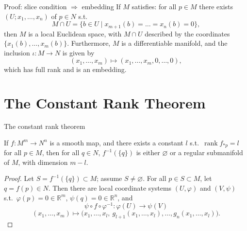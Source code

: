 \documentclass[10pt]{beamer}
\newcommand{\R}{\mathbb{R}}
\begin{document}
\begin{frame}{Proof: slice condition $\Rightarrow$ embedding}
	If $M$ satisfies: for all $p \in M$ there exists
	$(U; x_1, \dots, x_n)$ of $p \in N$ s.t.
	\[
		M \cap U = \{ b \in U \mid x_{m+1}(b) = \dots = x_n(b) = 0 \},
	\]
	then $M$ is a local Euclidean space, with $M \cap U$ described by
	the coordinates $\{ x_1(b), \dots, x_m(b) \}$. Furthermore, $M$
	is a differentiable manifold, and the inclusion $\iota : M \to N$
	is given by
	\[
		(x_1, \dots, x_m) \longmapsto (x_1, \dots, x_m, 0, \dots, 0),
	\]
	which has full rank and is an embedding. \qedhere
\end{frame}

\section{The Constant Rank Theorem}

\begin{frame}{The constant rank theorem}
	\begin{theorem}
		If $f : M^m \to N^n$ is a smooth map, and there exists a
		constant $l$ s.t.\ $\operatorname{rank} f_{*p} = l$ for all
		$p \in M$, then for all $q \in N$, $f^{-1}(\{q\})$ is either
		$\varnothing$ or a regular submanifold of $M$, with dimension
		$m - l$.
	\end{theorem}
	\begin{proof}
		Let $S = f^{-1}(\{q\}) \subset M$; assume $S \neq \varnothing$.
		For all $p \in S \subset M$, let $q = f(p) \in N$. Then there
		are local coordinate systems $(U, \varphi)$ and $(V, \psi)$
		s.t.\ $\varphi(p) = 0 \in \R^m$, $\psi(q) = 0 \in \R^n$, and
		\[
			\psi \circ f \circ \varphi^{-1}
			: \varphi(U) \longrightarrow \psi(V)
		\]
		\[
			(x_1, \dots, x_m) \longmapsto
			\bigl( x_1, \dots, x_l,\ g_{l+1}(x_1, \dots, x_l), \dots,
			g_n(x_1, \dots, x_l) \bigr).
		\]
	\end{proof}
\end{frame}
\end{document}
